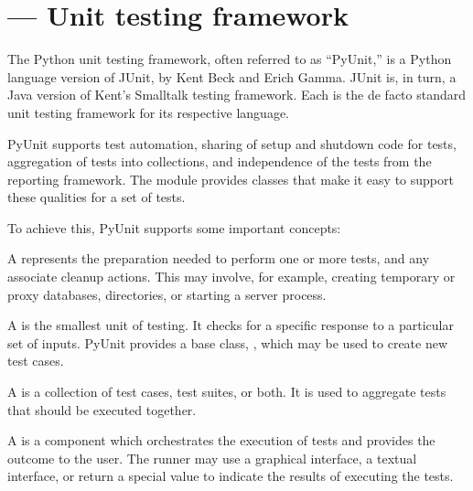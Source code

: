 \section{ ---
         Unit testing framework}



The Python unit testing framework, often referred to as ``PyUnit,'' is
a Python language version of JUnit, by Kent Beck and Erich Gamma.
JUnit is, in turn, a Java version of Kent's Smalltalk testing
framework.  Each is the de facto standard unit testing framework for
its respective language.

PyUnit supports test automation, sharing of setup and shutdown code
for tests, aggregation of tests into collections, and independence of
the tests from the reporting framework.  The  module
provides classes that make it easy to support these qualities for a
set of tests.

To achieve this, PyUnit supports some important concepts:

\begin{definitions}
A  represents the preparation needed to perform one
or more tests, and any associate cleanup actions.  This may involve,
for example, creating temporary or proxy databases, directories, or
starting a server process.

A  is the smallest unit of testing.  It checks for a
specific response to a particular set of inputs.  PyUnit provides a
base class, , which may be used to create new test
cases.

A  is a collection of test cases, test suites, or
both.  It is used to aggregate tests that should be executed
together.

A  is a component which orchestrates the execution of
tests and provides the outcome to the user.  The runner may use a
graphical interface, a textual interface, or return a special value to
indicate the results of executing the tests.
\end{definitions}


